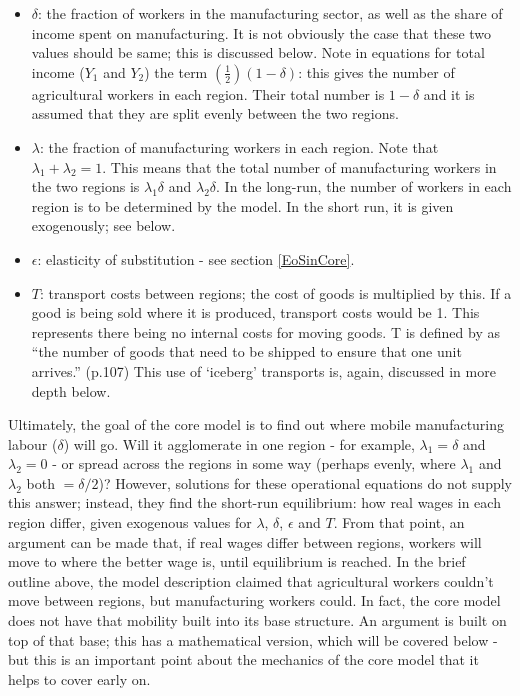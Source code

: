 \begin{itemize}
	\item $\delta$: the fraction of workers in the manufacturing sector, as well as the share of income spent on manufacturing. It is not obviously the case that these two values should be same; this is discussed below. Note in equations for total income ($Y_{1}$ and $Y_{2}$) the term $(\frac{1}{2})(1-\delta)$: this gives the number of agricultural workers in each region. Their total number is $1-\delta$ and it is assumed that they are split evenly between the two regions.
	\item $\lambda$: the fraction of manufacturing workers in each region. Note that $\lambda_{1}+\lambda_{2}=1$.  This means that the total number of manufacturing workers in the two regions is $\lambda_{1}\delta$ and $\lambda_{2}\delta$. In the long-run, the number of workers in each region is to be determined by the model. In the short run, it is given exogenously; see below.
	\item $\epsilon$: elasticity of substitution - see section \ref{EoSinCore}.
	\item $T$: transport costs between regions; the cost of goods is multiplied by this. If a good is being sold where it is produced, transport costs would be 1. This represents there being no internal costs for moving goods. T is defined by \citeauthor{brakman_new_2009} as ``the number of goods that need to be shipped to ensure that one unit arrives.'' (p.107) This use of `iceberg' transports is, again, discussed in more depth below.
\end{itemize}

Ultimately, the goal of the core model is to find out where mobile manufacturing labour ($\delta$) will go. Will it agglomerate in one region - for example, $\lambda_{1}=\delta$ and $\lambda_{2}=0$  - or spread across the regions in some way (perhaps evenly, where $\lambda_{1}$ and $\lambda_{2}$ both $=\delta/2$)? However, solutions for these operational equations do not supply this answer; instead, they find the short-run equilibrium: how real wages in each region differ, given exogenous values for $\lambda$, $\delta$, $\epsilon$ and $T$. From that point, an argument can be made that, if real wages differ between regions, workers will move to where the better wage is, until equilibrium is reached. In the brief outline above, the model description claimed that agricultural workers couldn't move between regions, but manufacturing workers could. In fact, the core model does not have that mobility built into its base structure. An argument is built on top of that base; this has a mathematical version, which will be covered below - but this is an important point about the mechanics of the core model that it helps to cover early on.

